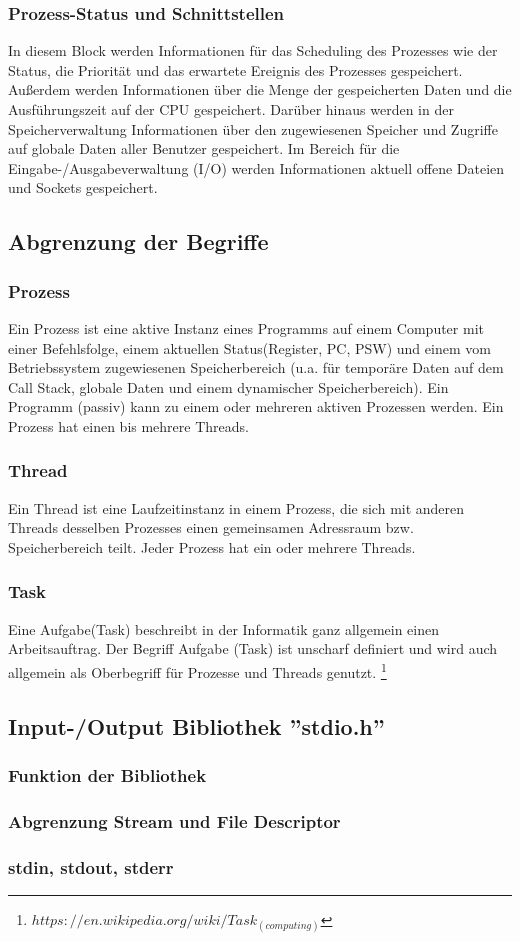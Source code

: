\documentclass[numbers=noendperiod]{scrartcl}
\begin{document}
\subsubsection{Prozess-Status und Schnittstellen}
In diesem Block werden Informationen für das Scheduling des Prozesses wie der Status, die Priorität und das erwartete Ereignis des Prozesses gespeichert. Außerdem werden Informationen über die Menge der gespeicherten Daten und die Ausführungszeit auf der CPU gespeichert. Darüber hinaus werden in der Speicherverwaltung Informationen über den zugewiesenen Speicher und Zugriffe auf globale Daten aller Benutzer gespeichert. Im Bereich für die Eingabe-/Ausgabeverwaltung (I/O) werden Informationen aktuell offene Dateien und Sockets gespeichert.

\subsection{Abgrenzung der Begriffe}
\subsubsection*{Prozess}
Ein Prozess ist eine aktive Instanz eines Programms auf einem Computer mit einer Befehlsfolge, einem aktuellen Status(Register, PC, PSW) und einem vom Betriebssystem zugewiesenen Speicherbereich (u.a. für temporäre Daten auf dem Call Stack, globale Daten und einem dynamischer Speicherbereich). Ein Programm (passiv) kann zu einem oder mehreren aktiven Prozessen werden. Ein Prozess hat einen bis mehrere Threads.
\subsubsection*{Thread}
Ein Thread ist eine Laufzeitinstanz in einem Prozess, die sich mit anderen Threads desselben Prozesses einen gemeinsamen Adressraum bzw. Speicherbereich teilt. Jeder Prozess hat ein oder mehrere Threads. 
\subsubsection*{Task}
Eine Aufgabe(Task) beschreibt in der Informatik ganz allgemein einen Arbeitsauftrag. Der Begriff Aufgabe (Task) ist unscharf definiert und wird auch allgemein als Oberbegriff für Prozesse und Threads genutzt. \footnote{$ https://en.wikipedia.org/wiki/Task_(computing)$}

\subsection{Input-/Output Bibliothek ''stdio.h''}
\subsubsection{Funktion der Bibliothek}
\subsubsection{Abgrenzung Stream und File Descriptor}
\subsubsection{stdin, stdout, stderr}
\end{document}
